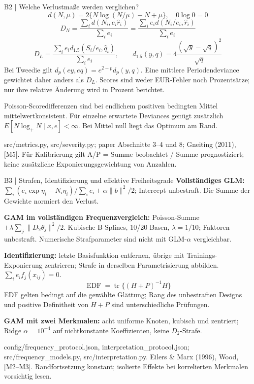 \documentclass[aspectratio=169,11pt]{beamer}
\newcommand{\source}[1]{\vfill{\fontsize{6.5}{7.4}\selectfont\color{muted}#1\par}}
\newcommand{\smalltext}{\fontsize{9}{11.3}\selectfont}
\begin{document}
\begin{frame}[t]{B2 | Welche Verlustmaße werden verglichen?}
\[
d(N,\mu)=2\{N\log(N/\mu)-N+\mu\},\quad 0\log0=0
\]
\[
D_N=\frac{\sum_i d(N_i,e_i\widehat r_i)}{\sum_i e_i}
=\frac{\sum_i e_i d(N_i/e_i,\widehat r_i)}{\sum_i e_i}
\]
\[
D_L=\frac{\sum_i e_i d_{1.5}(S_i/e_i,\widehat q_i)}{\sum_i e_i},\qquad
d_{1.5}(y,q)=4\frac{(\sqrt y-\sqrt q)^2}{\sqrt q}
\]
\smalltext Bei Tweedie gilt $d_p(e y,e q)=e^{2-p}d_p(y,q)$.
Eine mittlere Periodendeviance gewichtet daher anders als $D_L$.
Scores sind weder EUR-Fehler noch Prozentsätze; nur ihre relative Änderung wird in Prozent berichtet.\par\medskip
Poisson-Scoredifferenzen sind bei endlichem positiven bedingten Mittel mittelwertkonsistent.
Für einzelne erwartete Deviances genügt zusätzlich $E[N\log_+N\mid x,e]<\infty$.
Bei Mittel null liegt das Optimum am Rand.
\source{src/metrics.py, src/severity.py; paper Abschnitte 3--4 und 8; Gneiting (2011), [M5].
Für Kalibrierung gilt A/P = Summe beobachtet / Summe prognostiziert; keine zusätzliche Exponierungsgewichtung von Anzahlen.}
\end{frame}

\begin{frame}[t]{B3 | Strafen, Identifizierung und effektive Freiheitsgrade}
\smalltext
\textbf{Vollständiges GLM:}
$\sum_i(e_i\exp\eta_i-N_i\eta_i)/\sum_i e_i+\alpha\|b\|^2/2$;
Intercept unbestraft. Die Summe der Gewichte normiert den Verlust.\par\medskip
\textbf{GAM im vollständigen Frequenzvergleich:}
Poisson-Summe $+\lambda\sum_j\|D_2\theta_j\|^2/2$.
Kubische B-Splines, 10/20 Basen, $\lambda=1/10$;
Faktoren unbestraft. Numerische Strafparameter sind nicht mit GLM-$\alpha$ vergleichbar.\par\medskip
\textbf{Identifizierung:} letzte Basisfunktion entfernen, übrige mit Trainings-Exponierung zentrieren;
Strafe in derselben Parametrisierung abbilden. $\sum_i e_i f_j(x_{ij})=0$.
\[
\operatorname{EDF}=\operatorname{tr}\{(H+P)^{-1}H\}
\]
EDF gelten bedingt auf die gewählte Glättung; Rang des unbestraften Designs
und positive Definitheit von $H+P$ sind unterschiedliche Prüfungen.\par\medskip
\textbf{GAM mit zwei Merkmalen:} acht uniforme Knoten, kubisch und zentriert;
Ridge $\alpha=10^{-4}$ auf nichtkonstante Koeffizienten, keine $D_2$-Strafe.
\source{config/frequency\_protocol.json, interpretation\_protocol.json; src/frequency\_models.py, src/interpretation.py.
Eilers \& Marx (1996), Wood, [M2--M3]. Randfortsetzung konstant; isolierte Effekte bei korrelierten Merkmalen vorsichtig lesen.}
\end{frame}
\end{document}
